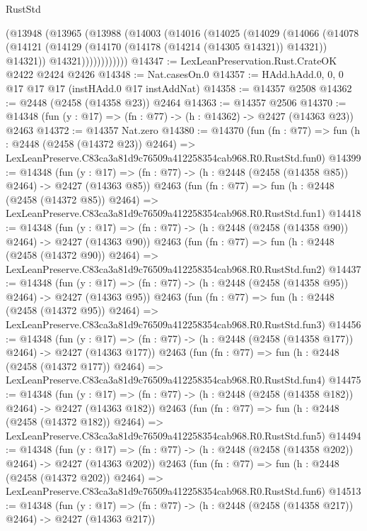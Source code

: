\begin{lexlean}{RustStd}
\begin{coremodule}
          (@13948
            (@13965
              (@13988
                (@14003
                  (@14016
                    (@14025
                      (@14029
                        (@14066
                          (@14078
                            (@14121
                              (@14129 (@14170 (@14178 (@14214 (@14305 @14321)) @14321)) @14321))
                            @14321))))))))))))
@14347 := LexLeanPreservation.Rust.CrateOK @2422 @2424 @2426
@14348 := Nat.casesOn.{0}
@14357 := HAdd.hAdd.{0, 0, 0} @17 @17 @17 (instHAdd.{0} @17 instAddNat)
@14358 := @14357 @2508
@14362 := @2448 (@2458 (@14358 @23)) @2464
@14363 := @14357 @2506
@14370 := @14348 (fun (y : @17) => (fn : @77) -> (h : @14362) -> @2427 (@14363 @23)) @2463
@14372 := @14357 Nat.zero
@14380 := @14370
    (fun (fn : @77) =>
    fun (h : @2448 (@2458 (@14372 @23)) @2464) =>
    LexLeanPreserve.C83ca3a81d9c76509a412258354cab968.R0.RustStd.fun0)
@14399 := @14348
    (fun (y : @17) => (fn : @77) -> (h : @2448 (@2458 (@14358 @85)) @2464) -> @2427 (@14363 @85))
    @2463
    (fun (fn : @77) =>
    fun (h : @2448 (@2458 (@14372 @85)) @2464) =>
    LexLeanPreserve.C83ca3a81d9c76509a412258354cab968.R0.RustStd.fun1)
@14418 := @14348
    (fun (y : @17) => (fn : @77) -> (h : @2448 (@2458 (@14358 @90)) @2464) -> @2427 (@14363 @90))
    @2463
    (fun (fn : @77) =>
    fun (h : @2448 (@2458 (@14372 @90)) @2464) =>
    LexLeanPreserve.C83ca3a81d9c76509a412258354cab968.R0.RustStd.fun2)
@14437 := @14348
    (fun (y : @17) => (fn : @77) -> (h : @2448 (@2458 (@14358 @95)) @2464) -> @2427 (@14363 @95))
    @2463
    (fun (fn : @77) =>
    fun (h : @2448 (@2458 (@14372 @95)) @2464) =>
    LexLeanPreserve.C83ca3a81d9c76509a412258354cab968.R0.RustStd.fun3)
@14456 := @14348
    (fun (y : @17) => (fn : @77) -> (h : @2448 (@2458 (@14358 @177)) @2464) -> @2427 (@14363 @177))
    @2463
    (fun (fn : @77) =>
    fun (h : @2448 (@2458 (@14372 @177)) @2464) =>
    LexLeanPreserve.C83ca3a81d9c76509a412258354cab968.R0.RustStd.fun4)
@14475 := @14348
    (fun (y : @17) => (fn : @77) -> (h : @2448 (@2458 (@14358 @182)) @2464) -> @2427 (@14363 @182))
    @2463
    (fun (fn : @77) =>
    fun (h : @2448 (@2458 (@14372 @182)) @2464) =>
    LexLeanPreserve.C83ca3a81d9c76509a412258354cab968.R0.RustStd.fun5)
@14494 := @14348
    (fun (y : @17) => (fn : @77) -> (h : @2448 (@2458 (@14358 @202)) @2464) -> @2427 (@14363 @202))
    @2463
    (fun (fn : @77) =>
    fun (h : @2448 (@2458 (@14372 @202)) @2464) =>
    LexLeanPreserve.C83ca3a81d9c76509a412258354cab968.R0.RustStd.fun6)
@14513 := @14348
    (fun (y : @17) => (fn : @77) -> (h : @2448 (@2458 (@14358 @217)) @2464) -> @2427 (@14363 @217))

\end{coremodule}
\end{lexlean}
